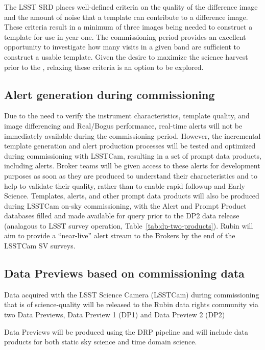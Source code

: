The LSST SRD places well-defined criteria on the quality of the difference image and the amount of noise that a template can contribute to a difference image.
These criteria result in a minimum of three images being needed to construct a template for use in year one.
The commissioning period provides an excellent opportunity to investigate how many visits in a given band are sufficient to construct a usable template.
Given the desire to maximize the science harvest prior to the \drone,  relaxing these criteria is an option to be explored.

\subsection{Alert generation during commissioning}

Due to the need to verify the instrument characteristics, template quality, and image differencing and Real/Bogus performance, real-time alerts will not be immediately available during the commissioning period.
However, the incremental template generation and alert production processes will be tested and optimized during commissioning with LSSTCam, resulting in a set of prompt data products, including alerts.
Broker teams will be given access to these alerts for development purposes as soon as they are produced to understand their characteristics and to help to validate their quality, rather than to enable rapid followup and Early Science. 
Templates, alerts, and other prompt data products will also be produced during LSSTCam on-sky commissioning, with the Alert and Prompt Product databases filled and made available for query prior to the DP2 data release (analagous to LSST survey operation, Table~\ref{tab:dp-two-products}). 
Rubin will aim to provide a ``near-live'' alert stream to the Brokers by the end of the LSSTCam SV surveys.


\subsection{Data Previews based on commissioning data}

Data acquired with the LSST Science Camera (LSSTCam) during commissioning that is of science-quality will be released to the Rubin data rights community via two Data Previews, Data Preview 1 (DP1) and Data Preview 2 (DP2) 

Data Previews will be produced using the DRP pipeline and will include data products for both static sky science and time domain science.
